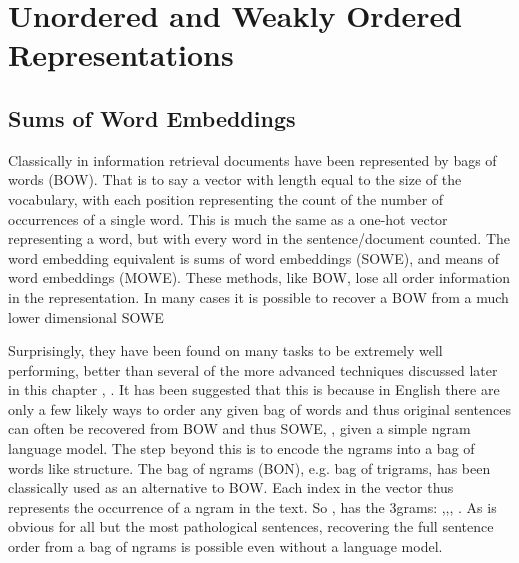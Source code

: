 \documentclass[12pt,parskip]{komatufte}
\begin{document}
\section{Unordered and Weakly Ordered Representations}

\subsection{Sums of Word Embeddings}

Classically in information retrieval documents have been represented by bags of words (BOW).
That is to say a vector with length equal to the size of the vocabulary, with each position representing the count of the number of occurrences of a single word.
This is much the same as a one-hot vector representing a word, but with every word in the sentence/document counted.
The word embedding equivalent is sums of word embeddings (SOWE), and means of word embeddings (MOWE).
These methods, like BOW, lose all order information in the representation.
In many cases it is possible to recover a BOW from a much lower dimensional SOWE 

Surprisingly, they have been found on many tasks to be extremely well performing, better than several of the more advanced techniques discussed later in this chapter  , .
It has been suggested that this is because in English there are only a few likely ways to order any given bag of words and thus original sentences can often be recovered from BOW  and thus SOWE, , given a simple ngram language model.
The step beyond this is to encode the ngrams into a bag of words like structure.
The bag of ngrams (BON), e.g. bag of trigrams, has been classically used as an alternative to BOW.
Each index in the vector thus represents the occurrence of a ngram in the text.
So , has the 3grams: ,,, .
As is obvious for all but the most pathological sentences, recovering the full sentence order from a bag of ngrams is possible even without a language model.
\end{document}
